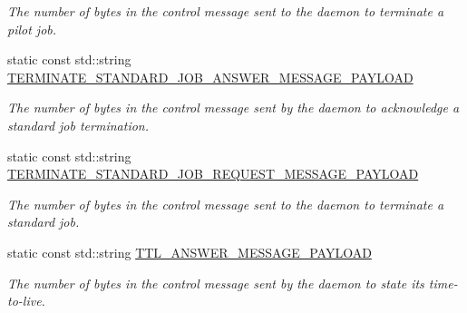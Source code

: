 \begin{DoxyCompactItemize}
\begin{DoxyCompactList}\small\item\em The number of bytes in the control message sent to the daemon to terminate a pilot job. \end{DoxyCompactList}\item 
\mbox{\label{classwrench_1_1_compute_service_message_payload_a734ce7db76ab5ec58a6c692ce4b8e18f}} 
static const std\+::string \hyperlink{classwrench_1_1_compute_service_message_payload_a734ce7db76ab5ec58a6c692ce4b8e18f}{T\+E\+R\+M\+I\+N\+A\+T\+E\+\_\+\+S\+T\+A\+N\+D\+A\+R\+D\+\_\+\+J\+O\+B\+\_\+\+A\+N\+S\+W\+E\+R\+\_\+\+M\+E\+S\+S\+A\+G\+E\+\_\+\+P\+A\+Y\+L\+O\+AD}
\begin{DoxyCompactList}\small\item\em The number of bytes in the control message sent by the daemon to acknowledge a standard job termination. \end{DoxyCompactList}\item 
\mbox{\label{classwrench_1_1_compute_service_message_payload_a24f99e315abb2e89e666e719af98d4dc}} 
static const std\+::string \hyperlink{classwrench_1_1_compute_service_message_payload_a24f99e315abb2e89e666e719af98d4dc}{T\+E\+R\+M\+I\+N\+A\+T\+E\+\_\+\+S\+T\+A\+N\+D\+A\+R\+D\+\_\+\+J\+O\+B\+\_\+\+R\+E\+Q\+U\+E\+S\+T\+\_\+\+M\+E\+S\+S\+A\+G\+E\+\_\+\+P\+A\+Y\+L\+O\+AD}
\begin{DoxyCompactList}\small\item\em The number of bytes in the control message sent to the daemon to terminate a standard job. \end{DoxyCompactList}\item 
\mbox{\label{classwrench_1_1_compute_service_message_payload_a79d0d40e02d24145252b7afb2c526cc5}} 
static const std\+::string \hyperlink{classwrench_1_1_compute_service_message_payload_a79d0d40e02d24145252b7afb2c526cc5}{T\+T\+L\+\_\+\+A\+N\+S\+W\+E\+R\+\_\+\+M\+E\+S\+S\+A\+G\+E\+\_\+\+P\+A\+Y\+L\+O\+AD}
\begin{DoxyCompactList}\small\item\em The number of bytes in the control message sent by the daemon to state its time-\/to-\/live. \end{DoxyCompactList}\item 

\end{DoxyCompactItemize}
